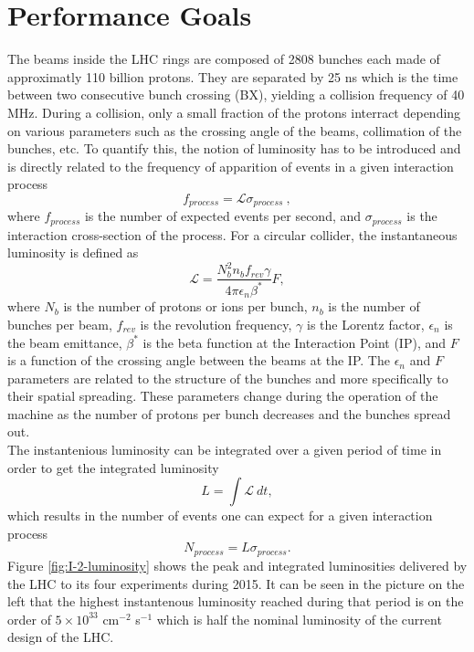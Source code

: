 	\section{Performance Goals}

  	The beams inside the LHC rings are composed of 2808 bunches each made of approximatly 110 billion protons. They are separated by 25 ns which is the time between two consecutive bunch crossing (BX), yielding a collision frequency of 40 MHz. During a collision, only a small fraction of the protons interract depending on various parameters such as the crossing angle of the beams, collimation of the bunches, etc. To quantify this, the notion of luminosity has to be introduced and is directly related to the frequency of apparition of events in a given interaction process
  	\begin{equation}
  		f_{process} = \mathcal{L} \sigma_{process} \ ,
  	\end{equation}
  	where $ f_{process} $ is the number of expected events per second, and $ \sigma_{process} $ is the interaction cross-section of the process. For a circular collider, the instantaneous luminosity is defined as
  	\begin{equation}
  		\mathcal{L} = \frac{N^2_b n_b f_{rev} \gamma}{4 \pi \epsilon_n \beta^*} F ,
  	\end{equation}
  	where $ N_b $ is the number of protons or ions per bunch, $ n_b $ is the number of bunches per beam, $ f_{rev} $ is the revolution frequency, $ \gamma $ is the Lorentz factor, $ \epsilon_n $ is the beam emittance, $ \beta^* $ is the beta function at the Interaction Point (IP), and $ F $ is a function of the crossing angle between the beams at the IP. The $ \epsilon_n $ and $ F $ parameters are related to the structure of the bunches and more specifically to their spatial spreading. These parameters change during the operation of the machine as the number of protons per bunch decreases and the bunches spread out. \\

    The instantenious luminosity can be integrated over a given period of time in order to get the integrated luminosity
  	\begin{equation}
  		L = \int \mathcal{L} \ dt ,
  	\end{equation}
  	which results in the number of events one can expect for a given interaction process
  	\begin{equation}
  		N_{process} = L \sigma_{process} .
  	\end{equation}
    Figure \ref{fig:I-2-luminosity} shows the peak and integrated luminosities delivered by the LHC to its four experiments during 2015. It can be seen in the picture on the left that the highest instantenous luminosity reached during that period is on the order of $ 5 \times 10^{33} $ cm$^{-2}$ s$^{-1}$ which is half the nominal luminosity of the current design of the LHC.


